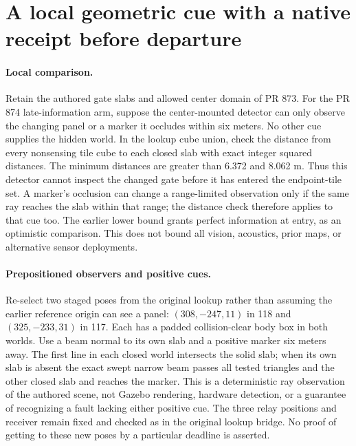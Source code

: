 \documentclass{article}
\begin{document}
\section*{A local geometric cue with a native receipt before departure}
\paragraph{Local comparison.}
Retain the authored gate slabs and allowed center domain of PR 873.
For the PR 874 late-information arm, suppose the center-mounted
detector can only observe the changing panel or a marker it occludes
within six meters. No other cue supplies the hidden world. In
the lookup cube union, check the distance from every nonsensing
tile cube to each closed slab with exact integer squared distances.
The minimum distances are greater than 6.372 and 8.062 m.
Thus this detector cannot inspect the changed gate before it
has entered the endpoint-tile set. A marker's occlusion can change
a range-limited observation only if the same ray reaches the slab
within that range; the distance check therefore applies to that cue too. The earlier lower bound grants
perfect information at entry, as an optimistic comparison.
This does not bound all vision, acoustics, prior maps, or alternative
sensor deployments.

\paragraph{Prepositioned observers and positive cues.}
Re-select two staged poses from the original lookup rather than
assuming the earlier reference origin can see a panel:
$(308,-247,11)$ in 118 and $(325,-233,31)$ in 117. Each has
a padded collision-clear body box in both worlds. Use a beam
normal to its own slab and a positive marker six meters away.
The first line in each closed world intersects the solid slab;
when its own slab is absent the exact swept narrow beam passes
all tested triangles and the other closed slab and reaches the
marker. This is a deterministic ray observation of the authored
scene, not Gazebo rendering, hardware detection, or a guarantee
of recognizing a fault lacking either positive cue. The three
relay positions and receiver remain fixed and checked as in the
original lookup bridge. No proof of getting to these new poses
by a particular deadline is asserted.
\end{document}

